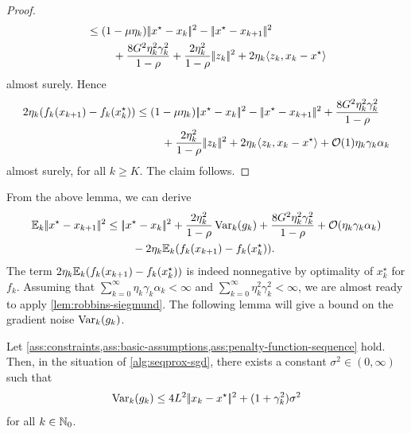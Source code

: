 \begin{proof}
\begin{align*}
        &\leq ( 1 - \mu\eta_k ) |\!|x^\star - x_k|\!|^2
            - |\!|x^\star - x_{k+1}|\!|^2  \\
        &\phantom{===} +  \frac{8 G^2\eta_k^2\gamma_k^2}{1 - \rho} + \frac{2\eta_k^2}{1 - \rho}|\!|z_k|\!|^2 + 2\eta_k\langle z_k, x_k - x^\star \rangle
    \end{align*}
    almost surely. Hence
    \begin{align*}
        2\eta_k ( f_k(x_{k+1}) - f_k(x_k^\star) )
        &\leq ( 1 - \mu\eta_k ) |\!|x^\star - x_k|\!|^2
            - |\!|x^\star - x_{k+1}|\!|^2 + \frac{8 G^2\eta_k^2\gamma_k^2}{1 - \rho}  \\
        &\phantom{===} + \frac{2\eta_k^2}{1 - \rho}|\!|z_k|\!|^2 + 2\eta_k\langle z_k, x_k - x^\star \rangle + \mathcal{O}(1)\eta_k\gamma_k\alpha_k
    \end{align*}
    almost surely, for all $k\geq K$. The claim follows.
\end{proof}
From the above lemma, we can derive
\begin{align*}
    \mathbb{E}_k|\!|x^\star - x_{k+1}|\!|^2
    &\leq
    |\!|x^\star - x_k|\!|^2
    + \frac{2\eta_k^2}{1 - \rho}\operatorname{Var}_k(g_k) + \frac{8 G^2\eta_k^2\gamma_k^2}{1 - \rho}
    + \mathcal{O}(\eta_k\gamma_k\alpha_k) \\
    &\phantom{===}- 2\eta_k\mathbb{E}_k(f_k(x_{k+1}) - f_k(x_k^\star)).
\end{align*}
The term $2\eta_k\mathbb{E}_k(f_k(x_{k+1}) - f_k(x_k^\star))$ is indeed nonnegative by optimality of $x_k^\star$
for $f_k$. Assuming that $\sum_{k=0}^\infty \eta_k\gamma_k\alpha_k < \infty$ and
$\sum_{k=0}^\infty \eta_k^2 \gamma_k^2 < \infty$, we are almost ready
to apply \cref{lem:robbins-siegmund}.
The following lemma will give a bound on the gradient noise $\operatorname{Var}_k(g_k)$.
\begin{lemma}
    \label{lem:bound-on-variance}
    Let \cref{ass:constraints,ass:basic-assumptions,ass:penalty-function-sequence} hold. Then, in the situation of \cref{alg:seqprox-sgd}, there
    exists a constant $\sigma^2\in(0,\infty)$ such that
    \[
        \operatorname{Var}_k(g_k) \leq 4 L^2 |\!|x_k - x^\star|\!|^2 + (1 + \gamma_k^2)\sigma^2
    \]
    for all $k\in\mathbb{N}_0$.
\end{lemma}

